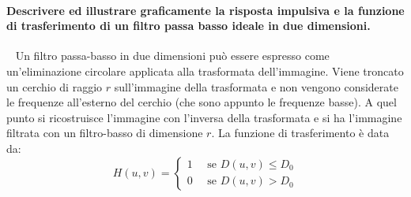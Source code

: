 \documentclass[a4paper,oneside]{scrbook}
\begin{document}
\paragraph{Descrivere ed illustrare graficamente la risposta impulsiva e la funzione di trasferimento di un filtro passa basso ideale in due dimensioni.}\
\newline
Un filtro passa-basso in due dimensioni può essere espresso come un'eliminazione circolare applicata alla trasformata dell'immagine. Viene troncato un cerchio
di raggio $r$ sull'immagine della trasformata e non vengono considerate le frequenze all'esterno del cerchio (che sono appunto le frequenze basse). A quel punto
si ricostruisce l'immagine con l'inversa della trasformata e si ha l'immagine filtrata con un filtro-basso di dimensione $r$.
La funzione di trasferimento è data da:
\begin{equation*}
	H(u,v)=
	\begin{cases}
		1 \quad \text{ se } D(u,v)\leq D_0\\
		0 \quad \text{ se } D(u,v)>D_0
	\end{cases}
\end{equation*}
\end{document}
